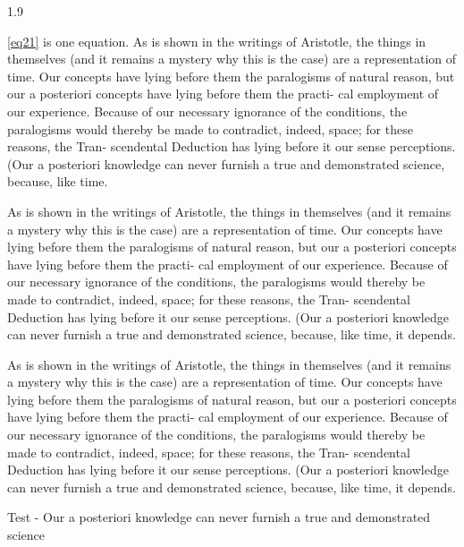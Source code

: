 \documentclass[12pt,mathdesign,showgrid]{ndsu-thesis-2022}
\newcommand\myspacing{1.9} %
\begin{document}
\begin{spacing}{\myspacing}

\noindent \cref{eq21} is one equation. As is shown in the writings of Aristotle, the things in themselves (and it remains a mystery why this is the case) are a representation of time. Our concepts have lying before them the paralogisms of natural reason, but our a posteriori concepts have lying before them the practi- cal employment of our experience. Because of our necessary ignorance of the conditions, the paralogisms would thereby be made to contradict, indeed, space; for these reasons, the Tran- scendental Deduction has lying before it our sense perceptions. (Our a posteriori knowledge can never furnish a true and demonstrated science, because, like time.


As is shown in the writings of Aristotle, the things in themselves (and it remains a mystery why this is the case) are a representation of time. Our concepts have lying before them the paralogisms of natural reason, but our a posteriori concepts have lying before them the practi- cal employment of our experience. Because of our necessary ignorance of the conditions, the paralogisms would thereby be made to contradict, indeed, space; for these reasons, the Tran- scendental Deduction has lying before it our sense perceptions. (Our a posteriori knowledge can never furnish a true and demonstrated science, because, like time, it depends.


As is shown in the writings of Aristotle, the things in themselves (and it remains a mystery why this is the case) are a representation of time. Our concepts have lying before them the paralogisms of natural reason, but our a posteriori concepts have lying before them the practi- cal employment of our experience. Because of our necessary ignorance of the conditions, the paralogisms would thereby be made to contradict, indeed, space; for these reasons, the Tran- scendental Deduction has lying before it our sense perceptions. (Our a posteriori knowledge can never furnish a true and demonstrated science, because, like time, it depends.


Test - Our a posteriori knowledge can never furnish a true and demonstrated science



\end{spacing}
\end{document}
